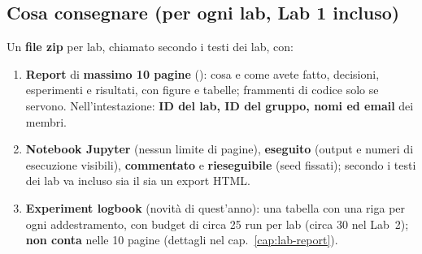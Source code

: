 \subsection{Cosa consegnare (per ogni lab, Lab 1 incluso)}
Un \textbf{file zip} per lab, chiamato  secondo i testi dei lab, con:
\begin{enumerate}
  \item \textbf{Report} di \textbf{massimo 10 pagine} (): cosa e come avete
        fatto, decisioni, esperimenti e risultati, con figure e tabelle; frammenti di codice solo se
        servono. Nell'intestazione: \textbf{ID del lab, ID del gruppo, nomi ed email} dei membri.
  \item \textbf{Notebook Jupyter} (nessun limite di pagine), \textbf{eseguito} (output e numeri di
        esecuzione visibili), \textbf{commentato} e \textbf{rieseguibile} (seed fissati); secondo i testi
        dei lab va incluso sia il  sia un export HTML.
  \item \textbf{Experiment logbook} (novità di quest'anno): una tabella con una riga per ogni
        addestramento, con budget di circa 25 run per lab (circa 30 nel Lab~2); \textbf{non conta} nelle 10 pagine
        (dettagli nel cap.~\ref{cap:lab-report}).
\end{enumerate}

